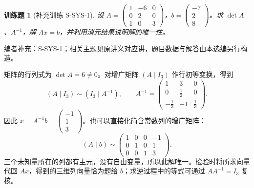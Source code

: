 \documentclass[12pt,fontset=fandol]{ctexart}
\newtheorem{exercise}{训练题}[section]
\begin{document}
\begin{exercise}[补充训练 S-SYS-1]\label{prob:S-SYS-1}
设 $A=\begin{pmatrix}1&-6&0\\0&2&0\\1&0&3\end{pmatrix}$，$b=\begin{pmatrix}-7\\2\\8\end{pmatrix}$。求 $\det A$、$A^{-1}$，解 $Ax=b$，并利用消元结果说明解的唯一性。
\end{exercise}
\noindent 编者补充：S-SYS-1；相关主题见原讲义对应讲，题目数据与解答由本选编另行构造。
\begin{solve}
矩阵的行列式为 $\det A=6\ne0$。对增广矩阵 $(A\mid I_3)$ 作行初等变换，得到
\[(A\mid I_3)\sim(I_3\mid A^{-1}),\qquad A^{-1}=\begin{pmatrix}1&3&0\\0&\frac{1}{2}&0\\-\frac{1}{3}&-1&\frac{1}{3}\end{pmatrix}.\]
因此 $x=A^{-1}b=\begin{pmatrix}-1\\1\\3\end{pmatrix}$。也可以直接化简含常数列的增广矩阵：
\[(A\mid b)\sim \begin{pmatrix}1&0&0&-1\\0&1&0&1\\0&0&1&3\end{pmatrix}.\]
三个未知量所在的列都有主元，没有自由变量，所以此解唯一。检验时将所求向量代回 $Ax$，得到的三维列向量恰为题给 $b$；求逆过程中的等式可通过 $AA^{-1}=I_3$ 复核。
\end{solve}
\end{document}
